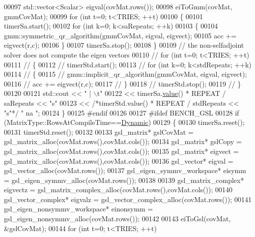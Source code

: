 \begin{DoxyCode}
00097     std::vector<Scalar> eigval(covMat.rows());
00098     eiToGmm(covMat, gmmCovMat);
00099     \textcolor{keywordflow}{for} (\textcolor{keywordtype}{int} t=0; t<TRIES; ++t)
00100     \{
00101       timerSa.start();
00102       \textcolor{keywordflow}{for} (\textcolor{keywordtype}{int} k=0; k<saRepeats; ++k)
00103       \{
00104         gmm::symmetric\_qr\_algorithm(gmmCovMat, eigval, eigvect);
00105         acc += eigvect(r,c);
00106       \}
00107       timerSa.stop();
00108     \}
00109     \textcolor{comment}{// the non-selfadjoint solver does not compute the eigen vectors}
00110 \textcolor{comment}{//     for (int t=0; t<TRIES; ++t)}
00111 \textcolor{comment}{//     \{}
00112 \textcolor{comment}{//       timerStd.start();}
00113 \textcolor{comment}{//       for (int k=0; k<stdRepeats; ++k)}
00114 \textcolor{comment}{//       \{}
00115 \textcolor{comment}{//         gmm::implicit\_qr\_algorithm(gmmCovMat, eigval, eigvect);}
00116 \textcolor{comment}{//         acc += eigvect(r,c);}
00117 \textcolor{comment}{//       \}}
00118 \textcolor{comment}{//       timerStd.stop();}
00119 \textcolor{comment}{//     \}}
00120 
00121     std::cout << \textcolor{stringliteral}{" | \(\backslash\)t"}
00122               << timerSa.\hyperlink{class_eigen_1_1_bench_timer_a26760f963ed8b64c126159bfea57735e}{value}() * REPEAT / saRepeats << \textcolor{stringliteral}{"s"}
00123               << \textcolor{comment}{/*timerStd.value() * REPEAT / stdRepeats << "s"*/} \textcolor{stringliteral}{"   na   "};
00124   \}
00125 \textcolor{preprocessor}{  #endif}
00126 
00127 \textcolor{preprocessor}{  #ifdef BENCH\_GSL}
00128   \textcolor{keywordflow}{if} (MatrixType::RowsAtCompileTime==\hyperlink{namespace_eigen_ad81fa7195215a0ce30017dfac309f0b2}{Dynamic})
00129   \{
00130     timerSa.reset();
00131     timerStd.reset();
00132 
00133     gsl\_matrix* gslCovMat = gsl\_matrix\_alloc(covMat.rows(),covMat.cols());
00134     gsl\_matrix* gslCopy = gsl\_matrix\_alloc(covMat.rows(),covMat.cols());
00135     gsl\_matrix* eigvect = gsl\_matrix\_alloc(covMat.rows(),covMat.cols());
00136     gsl\_vector* eigval  = gsl\_vector\_alloc(covMat.rows());
00137     gsl\_eigen\_symmv\_workspace* eisymm = gsl\_eigen\_symmv\_alloc(covMat.rows());
00138     
00139     gsl\_matrix\_complex* eigvectz = gsl\_matrix\_complex\_alloc(covMat.rows(),covMat.cols());
00140     gsl\_vector\_complex* eigvalz  = gsl\_vector\_complex\_alloc(covMat.rows());
00141     gsl\_eigen\_nonsymmv\_workspace* einonsymm = gsl\_eigen\_nonsymmv\_alloc(covMat.rows());
00142     
00143     eiToGsl(covMat, &gslCovMat);
00144     \textcolor{keywordflow}{for} (\textcolor{keywordtype}{int} t=0; t<TRIES; ++t)

\end{DoxyCode}
